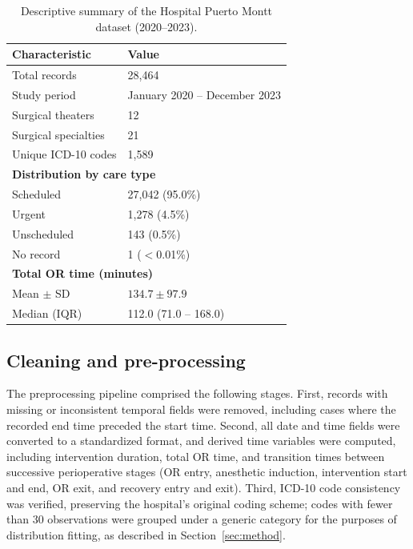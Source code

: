 \documentclass[sn-mathphys-num]{sn-jnl}
\begin{document}
\begin{table}[]
\centering
\caption{Descriptive summary of the Hospital Puerto Montt dataset
(2020--2023).}
\label{tab:dataset_summary}
\begin{tabular}{ll}
\toprule
Characteristic & Value \\
\midrule
Total records & 28{,}464 \\
Study period & January 2020 -- December 2023 \\
Surgical theaters & 12 \\
Surgical specialties & 21 \\
Unique ICD-10 codes & 1{,}589 \\
\midrule
\multicolumn{2}{l}{\textbf{Distribution by care type}} \\
\quad Scheduled & 27{,}042 (95.0\%) \\
\quad Urgent & 1{,}278 (4.5\%) \\
\quad Unscheduled & 143 (0.5\%) \\
\quad No record & 1 ($<$0.01\%) \\
\midrule
\multicolumn{2}{l}{\textbf{Total OR time (minutes)}} \\
\quad Mean $\pm$ SD & $134.7 \pm 97.9$ \\
\quad Median (IQR) & 112.0 (71.0 -- 168.0) \\
\bottomrule
\end{tabular}
\end{table}

\subsection{Cleaning and pre-processing}\label{Data-cleaning}

The preprocessing pipeline comprised the following stages. First,
records with missing or inconsistent temporal fields were removed,
including cases where the recorded end time preceded the start time.
Second, all date and time fields were converted to a standardized
format, and derived time variables were computed, including
intervention duration, total OR time, and transition times between
successive perioperative stages (OR entry, anesthetic induction,
intervention start and end, OR exit, and recovery entry and exit).
Third, ICD-10 code consistency was verified, preserving the hospital's
original coding scheme; codes with fewer than 30 observations were
grouped under a generic category for the purposes of distribution
fitting, as described in Section~\ref{sec:method}.
\end{document}
